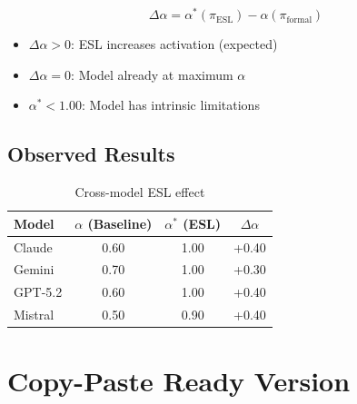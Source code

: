 \documentclass[11pt,a4paper]{article}
\begin{document}
\begin{equation}
\Delta\alpha = \alpha^*(\pi_{\text{ESL}}) - \alpha(\pi_{\text{formal}})
\end{equation}

\begin{itemize}
    \item $\Delta\alpha > 0$: ESL increases activation (expected)
    \item $\Delta\alpha = 0$: Model already at maximum $\alpha$
    \item $\alpha^* < 1.00$: Model has intrinsic limitations
\end{itemize}

\subsection{Observed Results}

\begin{table}[h]
\centering
\caption{Cross-model ESL effect}
\begin{tabular}{lccc}
\toprule
\textbf{Model} & $\alpha$ (Baseline) & $\alpha^*$ (ESL) & $\Delta\alpha$ \\
\midrule
Claude & 0.60 & 1.00 & +0.40 \\
Gemini & 0.70 & 1.00 & +0.30 \\
GPT-5.2 & 0.60 & 1.00 & +0.40 \\
Mistral & 0.50 & 0.90 & +0.40 \\
\bottomrule
\end{tabular}
\end{table}


\section{Copy-Paste Ready Version}
\end{document}
